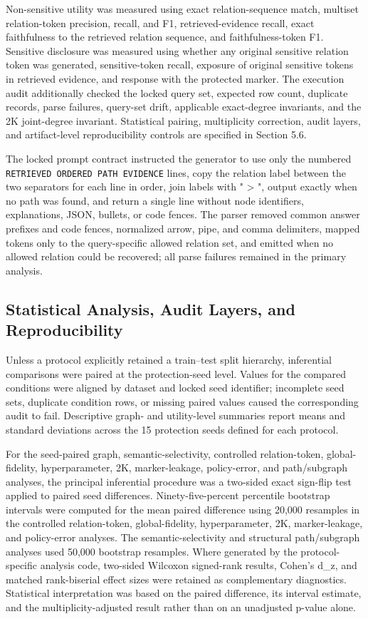 \documentclass[preprint,12pt]{elsarticle}
\begin{document}
Non-sensitive utility was measured using exact relation-sequence match, multiset relation-token precision, recall, and F1, retrieved-evidence recall, exact faithfulness to the retrieved relation sequence, and faithfulness-token F1. Sensitive disclosure was measured using whether any original sensitive relation token was generated, sensitive-token recall, exposure of original sensitive tokens in retrieved evidence, and response with the protected marker. The execution audit additionally checked the locked query set, expected row count, duplicate records, parse failures, query-set drift, applicable exact-degree invariants, and the 2K joint-degree invariant. Statistical pairing, multiplicity correction, audit layers, and artifact-level reproducibility controls are specified in Section 5.6.

The locked prompt contract instructed the generator to use only the numbered \texttt{RETRIEVED ORDERED PATH EVIDENCE} lines, copy the relation label between the two separators for each line in order, join labels with " > ", output exactly  when no path was found, and return a single line without node identifiers, explanations, JSON, bullets, or code fences. The parser removed common answer prefixes and code fences, normalized arrow, pipe, and comma delimiters, mapped tokens only to the query-specific allowed relation set, and emitted  when no allowed relation could be recovered; all parse failures remained in the primary analysis.

\subsection{Statistical Analysis, Audit Layers, and Reproducibility}
Unless a protocol explicitly retained a train--test split hierarchy, inferential comparisons were paired at the protection-seed level. Values for the compared conditions were aligned by dataset and locked seed identifier; incomplete seed sets, duplicate condition rows, or missing paired values caused the corresponding audit to fail. Descriptive graph- and utility-level summaries report means and standard deviations across the 15 protection seeds defined for each protocol.

For the seed-paired graph, semantic-selectivity, controlled relation-token, global-fidelity, hyperparameter, 2K, marker-leakage, policy-error, and path/subgraph analyses, the principal inferential procedure was a two-sided exact sign-flip test applied to paired seed differences. Ninety-five-percent percentile bootstrap intervals were computed for the mean paired difference using 20,000 resamples in the controlled relation-token, global-fidelity, hyperparameter, 2K, marker-leakage, and policy-error analyses. The semantic-selectivity and structural path/subgraph analyses used 50,000 bootstrap resamples. Where generated by the protocol-specific analysis code, two-sided Wilcoxon signed-rank results, Cohen's d\_z, and matched rank-biserial effect sizes were retained as complementary diagnostics. Statistical interpretation was based on the paired difference, its interval estimate, and the multiplicity-adjusted result rather than on an unadjusted p-value alone.
\end{document}

